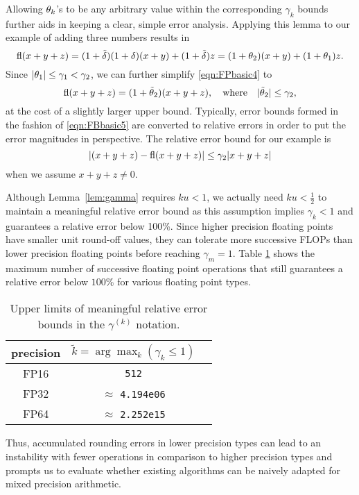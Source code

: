 Allowing $\theta_{k}$'s to be any arbitrary value within the corresponding $\gamma_{k}$ bounds further aids in keeping a clear, simple error analysis. 
Applying this lemma to our example of adding three numbers results in
\begin{equation}
\fl(x+y+z) = (1+\tilde{\dd})(1+\dd) (x+y) + (1+\tilde{\dd})z = (1+\tth_{2})(x+y) + (1+\tth_{1})z. \label{eqn:FPbasic4}
\end{equation}
Since $|\theta_{1}| \leq \gamma_{1} < \gamma_{2}$, we can further simplify \cref{eqn:FPbasic4} to
\begin{equation}
\fl(x+y+z) = (1+\tilde{\tth}_{2})(x+y+z), \quad \mbox{where} \quad |\tilde{\tth}_{2}| \leq \gamma_{2}, \label{eqn:FBbasic5}
\end{equation}
at the cost of a slightly larger upper bound. 
Typically, error bounds formed in the fashion of \cref{eqn:FBbasic5} are converted to relative errors in order to put the error magnitudes in perspective.
The relative error bound for our example is
\begin{equation*}
|(x+y+z) - \mathrm{fl}(x+y+z)|\leq \gamma_{2}|x+y+z|
\end{equation*}
when we assume $x+y+z\neq 0$.\par

Although Lemma~\ref{lem:gamma} requires $ku<1$, we actually need $ku <\frac{1}{2}$ to maintain a meaningful relative error bound as this assumption implies $\gamma_k < 1$ and guarantees a relative error below 100\%. 
Since higher precision floating points have smaller unit round-off values, they can tolerate more successive FLOPs than lower precision floating points before reaching $\gamma_m=1$. 
Table \ref{table:ieeen} shows the maximum number of successive floating point operations that still guarantees a relative error below $100$\% for various floating point types. 
\begin{table}[h]
	\centering
	\begin{tabular}{||c|c|c||} 
		\hline
		precision &$\tilde{k} = \arg\max_{k}(\gamma_k \leq 1)$ \\ \hline
		FP16 & {\tt 512}\\
		FP32 & $\approx$ {\tt 4.194e06} \\ 
		FP64 &  $\approx$ {\tt 2.252e15}\\ \hline 
	\end{tabular}
	\caption{Upper limits of meaningful relative error bounds in the $\gamma^{(k)}$ notation.}
	\label{table:ieeen}
\end{table}
\vspace*{-10pt}
Thus, accumulated rounding errors in lower precision types can lead to an instability with fewer operations in comparison to higher precision types and prompts us to evaluate whether existing algorithms can be naively adapted for mixed precision arithmetic. \par

